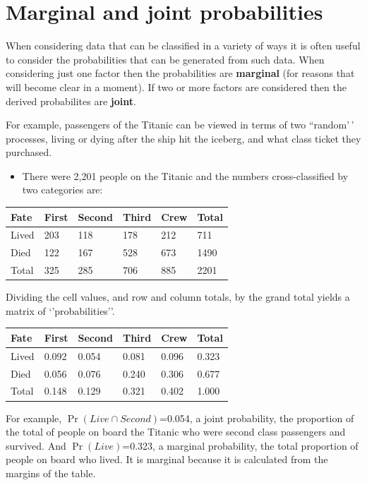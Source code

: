\documentclass[
  oneside]{krantz}
\providecommand{\tightlist}{%
  \setlength{\itemsep}{0pt}\setlength{\parskip}{0pt}}
\begin{document}
\hypertarget{marginal-and-joint-probabilities}{%
\section{Marginal and joint probabilities}\label{marginal-and-joint-probabilities}}

When considering data that can be classified in a variety of ways it is often useful to consider the probabilities that can be generated from such data. When considering just one factor then the probabilities are \textbf{marginal} (for reasons that will become clear in a moment). If two or more factors are considered then the derived probabilites are \textbf{joint}.

For example, passengers of the Titanic can be viewed in terms of two ``random'\,' processes, living or dying after the ship hit the iceberg, and what class ticket they purchased.

\begin{itemize}
\tightlist
\item
  There were 2,201 people on the Titanic and the numbers cross-classified by two categories are:
\end{itemize}

\begin{longtable}[]{@{}llllll@{}}
\toprule
Fate & First & Second & Third & Crew & Total\tabularnewline
\midrule
\endhead
Lived & 203 & 118 & 178 & 212 & 711\tabularnewline
Died & 122 & 167 & 528 & 673 & 1490\tabularnewline
Total & 325 & 285 & 706 & 885 & 2201\tabularnewline
\bottomrule
\end{longtable}

Dividing the cell values, and row and column totals, by the grand total
yields a matrix of `'probabilities''.

\begin{longtable}[]{@{}llllll@{}}
\toprule
Fate & First & Second & Third & Crew & Total\tabularnewline
\midrule
\endhead
Lived & 0.092 & 0.054 & 0.081 & 0.096 & 0.323\tabularnewline
Died & 0.056 & 0.076 & 0.240 & 0.306 & 0.677\tabularnewline
Total & 0.148 & 0.129 & 0.321 & 0.402 & 1.000\tabularnewline
\bottomrule
\end{longtable}

For example, \(\Pr(Live \cap Second)\)=0.054, a joint probability, the proportion of the total of people on board the Titanic who were second class passengers and survived.
And \(\Pr(Live)\)=0.323, a marginal probability, the total proportion of people on board who lived. It is marginal because it is calculated from the margins of the table.
\end{document}
